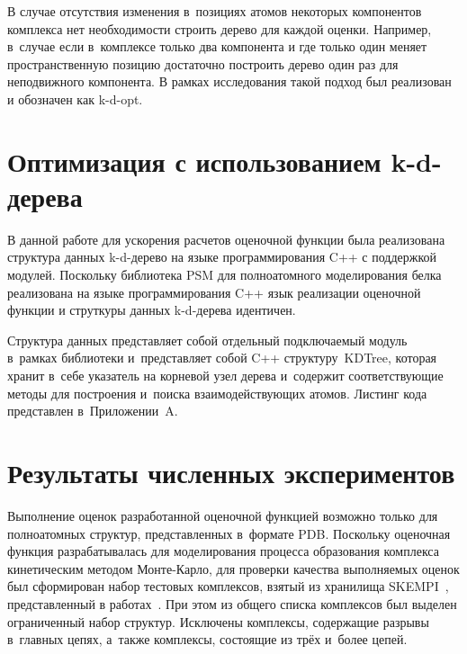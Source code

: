 В случае отсутствия изменения в~позициях атомов некоторых компонентов комплекса нет необходимости строить дерево для каждой оценки. Например, в~случае если в~комплексе только два компонента и где только один меняет пространственную позицию достаточно построить дерево один раз для неподвижного компонента. В рамках исследования такой подход был реализован и обозначен как k-d-opt.


\section{Оптимизация с использованием k-d-дерева}


В данной работе для ускорения расчетов оценочной функции была реализована структура данных k-d-дерево на языке программирования C++ с поддержкой модулей. Поскольку библиотека PSM для полноатомного моделирования белка реализована на языке программирования C++ язык реализации оценочной функции и струткуры данных k-d-дерева идентичен.

Структура данных представляет собой отдельный подключаемый модуль в~рамках библиотеки и~представляет собой C++ структуру~KDTree, которая хранит в~себе указатель на корневой узел дерева и~содержит соответствующие методы для построения и~поиска взаимодействующих атомов. Листинг кода представлен в~Приложении~A.





\section{Результаты численных экспериментов}

Выполнение оценок разработанной оценочной функцией возможно только для полноатомных структур, представленных в~формате PDB. Поскольку оценочная функция разрабатывалась для моделирования процесса образования комплекса кинетическим методом Монте-Карло, для проверки качества выполняемых оценок был сформирован набор тестовых комплексов, взятый из хранилища SKEMPI~\cite{skempi}, представленный в работах~\cite{biom10071056, rate}. При этом из общего списка комплексов был выделен ограниченный набор структур. Исключены комплексы, содержащие разрывы в~главных цепях, а~также комплексы, состоящие из трёх и~более цепей. 


